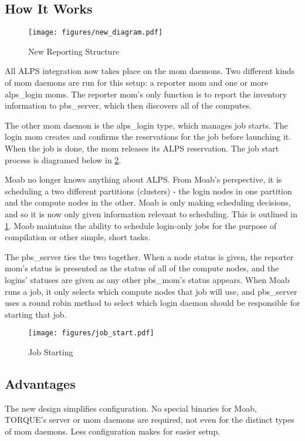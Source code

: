 \documentclass[10pt, conference, compsocconf]{IEEEtran}
\begin{document}
\subsection{How It Works}
\begin{figure}
  \centering
  \texttt{[image: figures/new\_diagram.pdf]}
  \caption{New Reporting Structure}\label{fig:reporting}
\end{figure}

All ALPS integration now takes place on the mom daemons. Two different kinds of mom daemons are
run for this setup: a reporter mom and one or more alps_login moms. The reporter mom's only function is to report
the inventory information to pbs_server, which then discovers all of the computes. 

The other mom daemon is the alps_login type, which manages job starts. The login mom creates and confirms
the reservations for the job before launching it. When the job is done, the mom releases its ALPS
reservation. The job start process is diagramed below in \ref{fig:starting}.

Moab no longer knows anything about ALPS. From Moab's perspective, it is scheduling a two different
partitions (clusters) - the login nodes in one partition and the compute nodes in the other. Moab is
only making scheduling decisions, and so it is now only given information relevant to scheduling. This is 
outlined in \ref{fig:reporting}. Moab maintains the ability to schedule login-only jobs for the 
purpose of compilation or other simple, short tasks. 

The pbs_server ties the two together. When a node status is given, the reporter mom's status is presented
as the status of all of the compute nodes, and the logins' statuses are given as any other pbs_mom's 
status appears. When Moab runs a job, it only selects which compute nodes that job will use, and pbs_server
uses a round robin method to select which login daemon should be responsible for starting that job. 

\begin{figure}
  \centering
  \texttt{[image: figures/job\_start.pdf]}
  \caption{Job Starting}\label{fig:starting}
\end{figure}

\subsection{Advantages}
The new design simplifies configuration. No special binaries for Moab, TORQUE's server or mom
daemons are required, not even for the distinct types of mom daemons. Less configuration makes
for easier setup.
\end{document}
